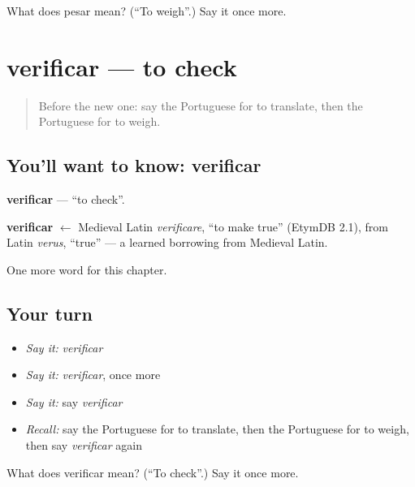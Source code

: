 \begin{tcolorbox}[breakable,colback=teal!4,colframe=teal!35!black,title={Before you move on}]
What does pesar mean? (\textquotedblleft{}To weigh\textquotedblright{}.) Say it once more.
\end{tcolorbox}
\section[verificar]{verificar — to check}

\label{lesson:PT-C232-verificar}



\begin{quote}
Before the new one: say the Portuguese for to translate, then the Portuguese for to weigh.
\end{quote}

\subsection*{You'll want to know: verificar}
\textbf{verificar} — \textquotedblleft{}to check\textquotedblright{}.

\begin{cousinweb}
\textbf{verificar} $\leftarrow$ Medieval Latin \emph{verificare}, \textquotedblleft{}to make true\textquotedblright{} (EtymDB 2.1), from Latin \emph{verus}, \textquotedblleft{}true\textquotedblright{} — a learned borrowing from Medieval Latin.
\end{cousinweb}

\begin{grammarlens}[title={What you've built}]
One more word for this chapter.
\end{grammarlens}

\subsection*{Your turn}
\begin{itemize}
\raggedright
  \item \emph{Say it:} \emph{verificar}
  \item \emph{Say it:} \emph{verificar}, once more
  \item \emph{Say it:} say \emph{verificar}
  \item \emph{Recall:} say the Portuguese for to translate, then the Portuguese for to weigh, then say \emph{verificar} again
\end{itemize}

\begin{tcolorbox}[breakable,colback=teal!4,colframe=teal!35!black,title={Before you move on}]
What does verificar mean? (\textquotedblleft{}To check\textquotedblright{}.) Say it once more.
\end{tcolorbox}
